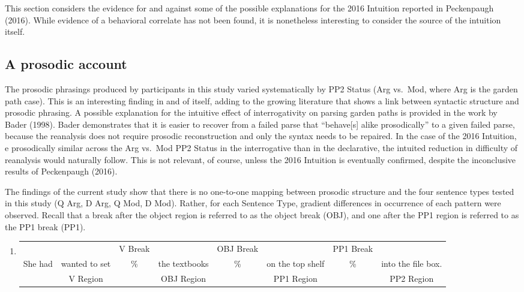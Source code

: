 \documentclass[11pt,oneside]{book}
\providecommand{\tightlist}{%
  \setlength{\itemsep}{0pt}\setlength{\parskip}{0pt}}
\begin{document}
This section considers the evidence for and against some of the possible explanations for the 2016 Intuition reported in Peckenpaugh (2016). While evidence of a behavioral correlate has not been found, it is nonetheless interesting to consider the source of the intuition itself.

\hypertarget{prep}{%
\subsection{A prosodic account}\label{prep}}

The prosodic phrasings produced by participants in this study varied systematically by PP2 Status (Arg vs.~Mod, where Arg is the garden path case). This is an interesting finding in and of itself, adding to the growing literature that shows a link between syntactic structure and prosodic phrasing. A possible explanation for the intuitive effect of interrogativity on parsing garden paths is provided in the work by Bader (1998). Bader demonstrates that it is easier to recover from a failed parse that ``behave{[}s{]} alike prosodically'' to a given failed parse, because the reanalysis does not require prosodic reconstruction and only the syntax needs to be repaired. In the case of the 2016 Intuition, e prosodically similar across the Arg vs.~Mod PP2 Status in the interrogative than in the declarative, the intuited reduction in difficulty of reanalysis would naturally follow. This is not relevant, of course, unless the 2016 Intuition is eventually confirmed, despite the inconclusive results of Peckenpaugh (2016).

The findings of the current study show that there is no one-to-one mapping between prosodic structure and the four sentence types tested in this study (Q Arg, D Arg, Q Mod, D Mod). Rather, for each Sentence Type, gradient differences in occurrence of each pattern were observed. Recall that a break after the object region is referred to as the object break (OBJ), and one after the PP1 region is referred to as the PP1 break (PP1).

\begin{enumerate}
\def\labelenumi{(\arabic{enumi})}
\setcounter{enumi}{46}
\tightlist
\item
  \begingroup
  \setlength{\tabcolsep}{1pt}

  \begin{tabular}{cccccccc}
    & & \footnotesize V Break & & \footnotesize OBJ Break & & \footnotesize PP1 Break & \\
    She had & wanted to set & \% & the textbooks & \% & on the top shelf & \% & into the file box. \\
    \cmidrule(r){2-2} \cmidrule(r){4-4} \cmidrule(r){6-6} \cmidrule(r){8-8} 
    & \footnotesize V Region & & \footnotesize OBJ Region & & \footnotesize PP1 Region & & PP2 Region \\
  \end{tabular}
    \endgroup
\end{enumerate}
\end{document}
